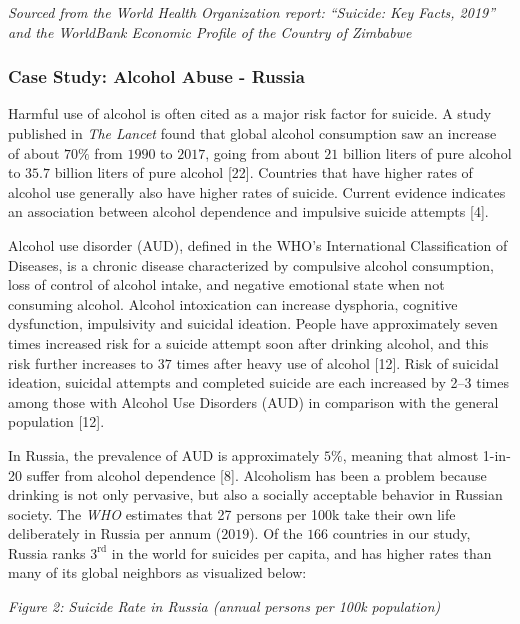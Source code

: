 \documentclass[]{article}
\begin{document}
\emph{Sourced from the World Health Organization report: ``Suicide: Key
Facts, 2019'' and the WorldBank Economic Profile of the Country of
Zimbabwe}

\newpage 

\subsubsection{Case Study: Alcohol Abuse -
Russia}\label{case-study-alcohol-abuse---russia}

Harmful use of alcohol is often cited as a major risk factor for
suicide. A study published in \emph{The Lancet} found that global
alcohol consumption saw an increase of about \(70\%\) from \(1990\) to
\(2017\), going from about \(21\) billion liters of pure alcohol to
\(35.7\) billion liters of pure alcohol {[}22{]}. Countries that have
higher rates of alcohol use generally also have higher rates of suicide.
Current evidence indicates an association between alcohol dependence and
impulsive suicide attempts {[}4{]}.

Alcohol use disorder (AUD), defined in the WHO's International
Classification of Diseases, is a chronic disease characterized by
compulsive alcohol consumption, loss of control of alcohol intake, and
negative emotional state when not consuming alcohol. Alcohol
intoxication can increase dysphoria, cognitive dysfunction, impulsivity
and suicidal ideation. People have approximately seven times increased
risk for a suicide attempt soon after drinking alcohol, and this risk
further increases to \(37\) times after heavy use of alcohol {[}12{]}.
Risk of suicidal ideation, suicidal attempts and completed suicide are
each increased by 2--3 times among those with Alcohol Use Disorders
(AUD) in comparison with the general population {[}12{]}.

In Russia, the prevalence of AUD is approximately \(5\%\), meaning that
almost 1-in-20 suffer from alcohol dependence {[}8{]}. Alcoholism has
been a problem because drinking is not only pervasive, but also a
socially acceptable behavior in Russian society. The \emph{WHO}
estimates that 27 persons per 100k take their own life deliberately in
Russia per annum (\(2019\)). Of the \(166\) countries in our study,
Russia ranks \(3^{\text{rd}}\) in the world for suicides per capita, and
has higher rates than many of its global neighbors as visualized below:

\emph{Figure 2: Suicide Rate in Russia (annual persons per 100k
population)}
\end{document}

